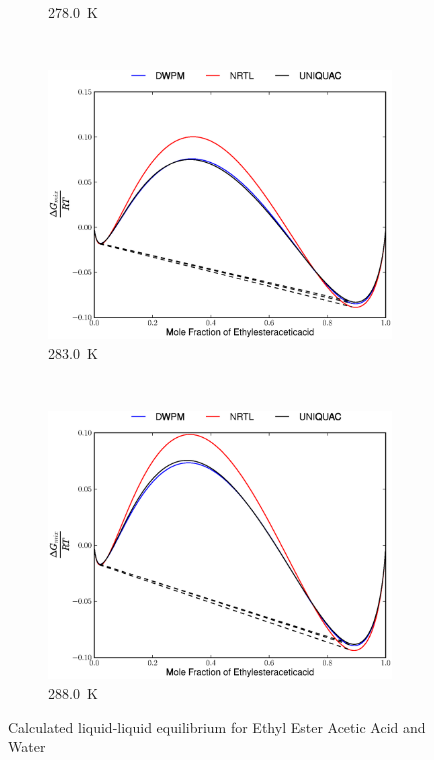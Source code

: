 \begin{figure}[hp]
\begin{subfigure}[h]{0.5\textwidth}
	\caption{278.0~$\mathrm{K}$} 
\end{subfigure}%
\\%
\begin{subfigure}[h]{0.5\textwidth}
	\centering
	\includegraphics[width = \textwidth]{Results_Parts/BinaryParams/ethylesteraceticacid-water/AllModelsGibbsPlots/T_283.0.eps}
	\caption{283.0~$\mathrm{K}$}
\end{subfigure}%
~%
\begin{subfigure}[h]{0.5\textwidth}
	\centering
	\includegraphics[width = \textwidth]{Results_Parts/BinaryParams/ethylesteraceticacid-water/AllModelsGibbsPlots/T_288.0.eps}
	\caption{288.0~$\mathrm{K}$}
\end{subfigure}%
\caption{Calculated liquid-liquid equilibrium for Ethyl Ester Acetic Acid and Water}
\end{figure}
